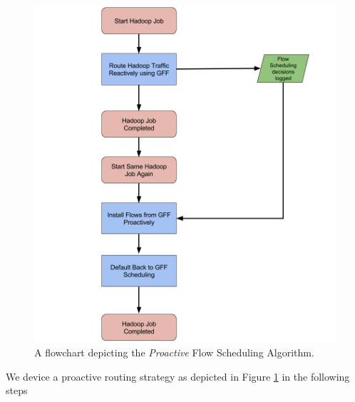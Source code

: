 \begin{figure}[!ht] 
	\centerline{\includegraphics[scale=0.42]{graphics/chapter4/ProactiveAlgorithm.png}}
	\caption{A flowchart depicting the \textit{Proactive} Flow Scheduling Algorithm.}
	\label{fig:ProactiveAlgo}
\end{figure}
We device a proactive routing strategy as depicted in Figure \ref{fig:ProactiveAlgo} in the following steps

